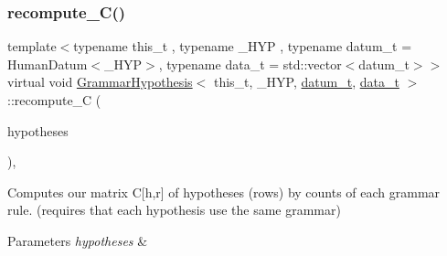 \mbox{\label{class_grammar_hypothesis_a6a1fadc201aa1ab1c9fe32102886ae2c}} 
\subsubsection{\texorpdfstring{recompute\+\_\+\+C()}{recompute\_C()}}
{\footnotesize\ttfamily template$<$typename this\+\_\+t , typename \+\_\+\+H\+YP , typename datum\+\_\+t  = Human\+Datum$<$\+\_\+\+H\+Y\+P$>$, typename data\+\_\+t  = std\+::vector$<$datum\+\_\+t$>$$>$ \\
virtual void \hyperlink{class_grammar_hypothesis}{Grammar\+Hypothesis}$<$ this\+\_\+t, \+\_\+\+H\+YP, \hyperlink{class_bayesable_a9f1a6c0cd7855550fa10b1a8f13a5867}{datum\+\_\+t}, \hyperlink{class_bayesable_aa2788c4d7718c0a824e1d28c4c98f921}{data\+\_\+t} $>$\+::recompute\+\_\+C (\begin{DoxyParamCaption}\item[{std\+::vector$<$ \hyperlink{class_grammar_hypothesis_a28fc99df28de741179719c94ecd77699}{H\+YP} $>$ \&}]{hypotheses }\end{DoxyParamCaption})\hspace{0.3cm}{\ttfamily [inline]}, {\ttfamily [virtual]}}



Computes our matrix C\mbox{[}h,r\mbox{]} of hypotheses (rows) by counts of each grammar rule. (requires that each hypothesis use the same grammar) 


\begin{DoxyParams}{Parameters}
{\em hypotheses} & \\
\hline
\end{DoxyParams}
\mbox{\label{class_grammar_hypothesis_a8476132b0ea0f4d0743dde525ce37ba9}} 
